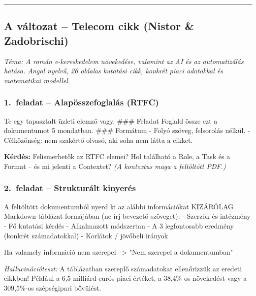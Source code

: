 \documentclass[11pt,a4paper]{article}
\begin{document}
\bigskip\noindent\rule{\linewidth}{0.4pt}\bigskip

\subsection{A változat -- Telecom cikk (Nistor \& Zadobrischi)}

\noindent\textit{Téma: A román e-kereskedelem növekedése, valamint az AI és az automatizálás hatása.
Angol nyelvű, 26 oldalas kutatási cikk, konkrét piaci adatokkal
és matematikai modellel.}

\bigskip

\subsubsection*{1.\ feladat -- Alapösszefoglalás (RTFC)}

\begin{prompt}
Te egy tapasztalt üzleti elemző vagy.
### Feladat
Foglald össze ezt a dokumentumot 5 mondatban.
### Formátum
- Folyó szöveg, felsorolás nélkül.
- Célközönség: nem szakértő olvasó, aki soha nem látta a cikket.
\end{prompt}

\noindent\textbf{Kérdés:} Felismerhetők az RTFC elemei?
Hol található a Role, a Task és a Format -- és mi jelenti a Contextet?
\textit{(A kontextus maga a feltöltött PDF.)}

\bigskip

\subsubsection*{2.\ feladat -- Strukturált kinyerés}

\begin{prompt}
A feltöltött dokumentumból nyerd ki az alábbi információkat
KIZÁRÓLAG Markdown-táblázat formájában (ne írj bevezető szöveget):
- Szerzők és intézmény
- Fő kutatási kérdés
- Alkalmazott módszertan
- A 3 legfontosabb eredmény (konkrét számadatokkal)
- Korlátok / jövőbeli irányok

Ha valamely információ nem szerepel --> "Nem szerepel a dokumentumban"
\end{prompt}

\noindent\textit{Hallucinációteszt:} A táblázatban szereplő számadatokat
ellenőrizzük az eredeti cikkben! Például a 6,5 milliárd eurós piaci értéket,
a 38,4\%-os növekedést vagy a 309,5\%-os szépségipari bővülést.
\end{document}
